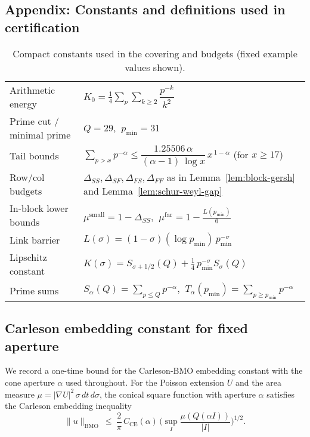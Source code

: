 \documentclass[11pt]{article}
\theoremstyle{definition}
\theoremstyle{remark}
\begin{document}
\vspace{1.0cm}
\subsection*{Appendix: Constants and definitions used in certification}

\begin{table}[H]
\centering
\caption{Compact constants used in the covering and budgets (fixed example values shown).}
\begin{tabular}{l l}
\toprule
Arithmetic energy & $K_0=\tfrac14\sum_{p}\sum_{k\ge2} \dfrac{p^{-k}}{k^2}$ \\ 
Prime cut / minimal prime & $Q=29$, $\ p_{\min}=31$ \\ 
Tail bounds & $\sum_{p>x}p^{-\alpha} \le \dfrac{1.25506\,\alpha}{(\alpha-1)\,\log x}\,x^{\,1-\alpha}$ (for $x\ge 17$) \\ 
Row/col budgets & $\Delta_{SS},\Delta_{SF},\Delta_{FS},\Delta_{FF}$ as in Lemma~\ref{lem:block-gersh} and Lemma~\ref{lem:schur-weyl-gap} \\ 
In-block lower bounds & $\mu^{\mathrm{small}}=1-\Delta_{SS}$, $\ \mu^{\mathrm{far}}=1-\tfrac{L(p_{\min})}{6}$ \\ 
Link barrier & $L(\sigma)=(1-\sigma)(\log p_{\min})\,p_{\min}^{-\sigma}$ \\ 
Lipschitz constant & $K(\sigma)=S_{\sigma+1/2}(Q)+\tfrac14\,p_{\min}^{-\sigma}S_{\sigma}(Q)$ \\ 
Prime sums & $S_{\alpha}(Q)=\sum_{p\le Q} p^{-\alpha}$, $\ T_{\alpha}(p_{\min})=\sum_{p\ge p_{\min}} p^{-\alpha}$ \\ 
\bottomrule
\end{tabular}
\end{table}









\subsection{Carleson embedding constant for fixed aperture}
\label{app:CE-constant}
We record a one-time bound for the Carleson-BMO embedding constant with the cone aperture $\alpha$ used throughout. For the Poisson extension $U$ and the area measure $\mu=|\nabla U|^2\,\sigma\,dt\,d\sigma$, the conical square function with aperture $\alpha$ satisfies the Carleson embedding inequality
\[
  \|u\|_{\mathrm{BMO}}\ \le\ \frac{2}{\pi}\,C_{\mathrm{CE}}(\alpha)\,\Big(\sup_I \frac{\mu(Q(\alpha I))}{|I|}\Big)^{\!1/2}.
\]
\end{document}
